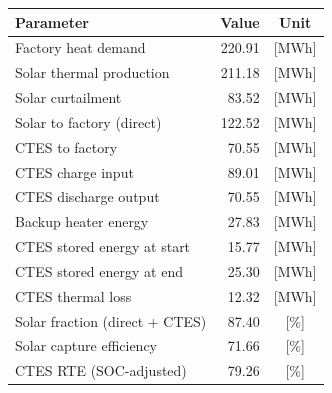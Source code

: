\renewcommand{\arraystretch}{1.2}
\begin{table}[h]
\centering
\begin{tabular}{l|r c}
\hline
Parameter & Value & Unit \\
\hline
Factory heat demand & 220.91 & [MWh] \\
Solar thermal production & 211.18 & [MWh] \\
Solar curtailment & 83.52 & [MWh] \\
Solar to factory (direct) & 122.52 & [MWh] \\
CTES to factory & 70.55 & [MWh] \\
CTES charge input & 89.01 & [MWh] \\
CTES discharge output & 70.55 & [MWh] \\
Backup heater energy & 27.83 & [MWh] \\
CTES stored energy at start & 15.77 & [MWh] \\
CTES stored energy at end & 25.30 & [MWh] \\
CTES thermal loss & 12.32 & [MWh] \\
\hline
Solar fraction (direct + CTES) & 87.40 & [\%] \\
Solar capture efficiency & 71.66 & [\%] \\
CTES RTE (SOC-adjusted) & 79.26 & [\%] \\
\hline
\end{tabular}
\end{table}

